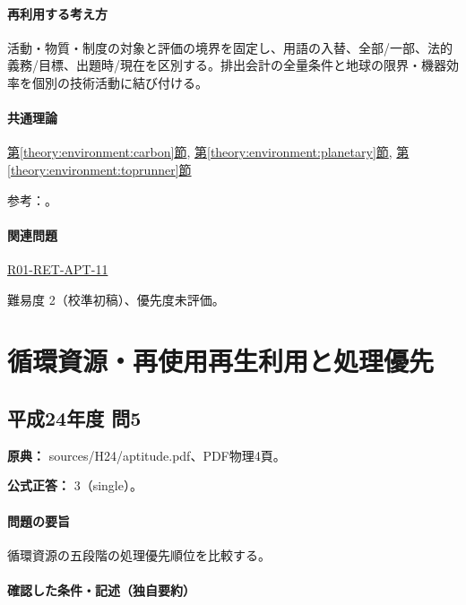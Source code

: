 \paragraph{再利用する考え方} 活動・物質・制度の対象と評価の境界を固定し、用語の入替、全部/一部、法的義務/目標、出題時/現在を区別する。排出会計の全量条件と地球の限界・機器効率を個別の技術活動に結び付ける。

\paragraph{共通理論} \hyperref[theory:environment:carbon]{第\ref*{theory:environment:carbon}節}, \hyperref[theory:environment:planetary]{第\ref*{theory:environment:planetary}節}, \hyperref[theory:environment:toprunner]{第\ref*{theory:environment:toprunner}節}

\par 参考：\cite{env_neutral2011,env_offset_guideline,env_planetary,env_toprunner2019}。

\paragraph{関連問題} \hyperref[q:r01-ret-apt-11]{R01-RET-APT-11}

\par 難易度 2（校準初稿）、優先度未評価。

\section{循環資源・再使用再生利用と処理優先}

\subsection{平成24年度 問5}
\label{q:h24-reg-apt-05}

\noindent\textbf{原典：} sources/H24/aptitude.pdf、PDF物理4頁。

\textbf{公式正答：} 3（single）。

\paragraph{問題の要旨} 循環資源の五段階の処理優先順位を比較する。

\paragraph{確認した条件・記述（独自要約）}\mbox{}\par


